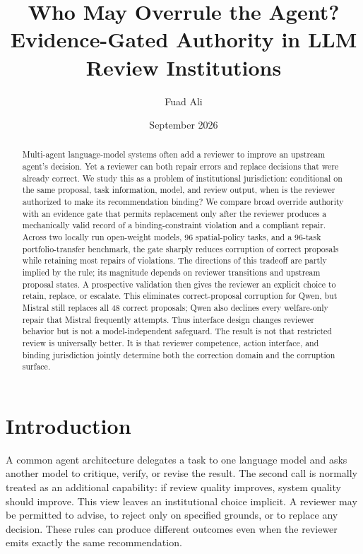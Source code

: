 \documentclass[10pt]{article}
\title{Who May Overrule the Agent?\\Evidence-Gated Authority in LLM Review Institutions}
\author{Fuad Ali}
\date{September 2026}
\begin{document}
\maketitle

\begin{abstract}
Multi-agent language-model systems often add a reviewer to improve an upstream
agent's decision. Yet a reviewer can both repair errors and replace decisions
that were already correct. We study this as a problem of institutional
jurisdiction: conditional on the same proposal, task information, model, and
review output, when is the reviewer authorized to make its recommendation
binding? We compare broad override authority with an evidence gate that permits
replacement only after the reviewer produces a mechanically valid record of a
binding-constraint violation and a compliant repair. Across two locally run
open-weight models, 96 spatial-policy tasks, and a 96-task portfolio-transfer
benchmark, the gate sharply reduces corruption of correct proposals while
retaining most repairs of violations. The directions of this tradeoff are partly
implied by the rule; its magnitude depends on reviewer transitions and upstream
proposal states. A prospective validation then gives the reviewer an explicit
choice to retain, replace, or escalate. This eliminates correct-proposal
corruption for Qwen, but Mistral still replaces all 48 correct proposals; Qwen
also declines every welfare-only repair that Mistral frequently attempts. Thus
interface design changes reviewer behavior but is not a model-independent
safeguard. The result is not that restricted review is universally better. It is
that reviewer competence, action interface, and binding jurisdiction jointly
determine both the correction domain and the corruption surface.
\end{abstract}

\section{Introduction}

A common agent architecture delegates a task to one language
model and asks another model to critique, verify, or revise the result. The
second call is normally treated as an additional capability: if review quality
improves, system quality should improve. This view leaves an institutional
choice implicit. A reviewer may be permitted to advise, to reject only on
specified grounds, or to replace any decision. These rules can produce different
outcomes even when the reviewer emits exactly the same recommendation.
\end{document}
